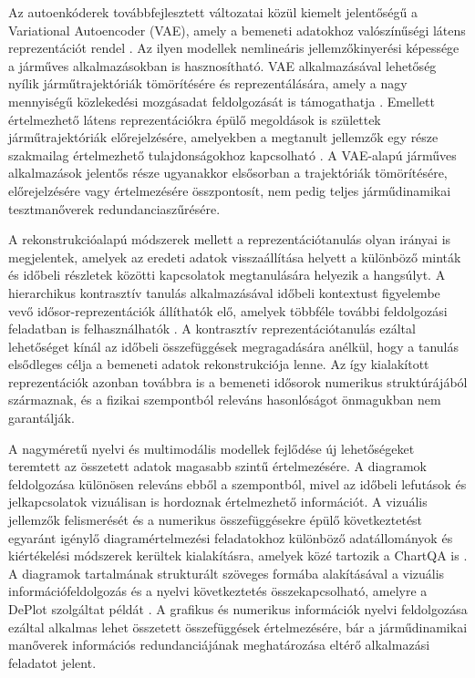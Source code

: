 \documentclass[12pt,a4paper,onehalfspacing, oneside]{book} %
\begin{document}
Az autoenkóderek továbbfejlesztett változatai közül kiemelt jelentőségű a Variational Autoencoder (VAE), amely a bemeneti adatokhoz valószínűségi látens reprezentációt rendel \cite{kingma2013auto}. Az ilyen modellek nemlineáris jellemzőkinyerési képessége a járműves alkalmazásokban is hasznosítható. VAE alkalmazásával lehetőség nyílik járműtrajektóriák tömörítésére és reprezentálására, amely a nagy mennyiségű közlekedési mozgásadat feldolgozását is támogathatja \cite{rakos2020compression}. Emellett értelmezhető látens reprezentációkra épülő megoldások is születtek járműtrajektóriák előrejelzésére, amelyekben a megtanult jellemzők egy része szakmailag értelmezhető tulajdonságokhoz kapcsolható \cite{neumeier2021variational}. A VAE-alapú járműves alkalmazások jelentős része ugyanakkor elsősorban a trajektóriák tömörítésére, előrejelzésére vagy értelmezésére összpontosít, nem pedig teljes járműdinamikai tesztmanőverek redundanciaszűrésére.

A rekonstrukcióalapú módszerek mellett a reprezentációtanulás olyan irányai is megjelentek, amelyek az eredeti adatok visszaállítása helyett a különböző minták és időbeli részletek közötti kapcsolatok megtanulására helyezik a hangsúlyt. A hierarchikus kontrasztív tanulás alkalmazásával időbeli kontextust figyelembe vevő idősor-reprezentációk állíthatók elő, amelyek többféle további feldolgozási feladatban is felhasználhatók \cite{yue2022ts2vec}. A kontrasztív reprezentációtanulás ezáltal lehetőséget kínál az időbeli összefüggések megragadására anélkül, hogy a tanulás elsődleges célja a bemeneti adatok rekonstrukciója lenne. Az így kialakított reprezentációk azonban továbbra is a bemeneti idősorok numerikus struktúrájából származnak, és a fizikai szempontból releváns hasonlóságot önmagukban nem garantálják.

A nagyméretű nyelvi és multimodális modellek fejlődése új lehetőségeket teremtett az összetett adatok magasabb szintű értelmezésére. A diagramok feldolgozása különösen releváns ebből a szempontból, mivel az időbeli lefutások és jelkapcsolatok vizuálisan is hordoznak értelmezhető információt. A vizuális jellemzők felismerését és a numerikus összefüggésekre épülő következtetést egyaránt igénylő diagramértelmezési feladatokhoz különböző adatállományok és kiértékelési módszerek kerültek kialakításra, amelyek közé tartozik a ChartQA is \cite{masry2022chartqa}. A diagramok tartalmának strukturált szöveges formába alakításával a vizuális információfeldolgozás és a nyelvi következtetés összekapcsolható, amelyre a DePlot szolgáltat példát \cite{liu2023deplot}. A grafikus és numerikus információk nyelvi feldolgozása ezáltal alkalmas lehet összetett összefüggések értelmezésére, bár a járműdinamikai manőverek információs redundanciájának meghatározása eltérő alkalmazási feladatot jelent.
\end{document}
